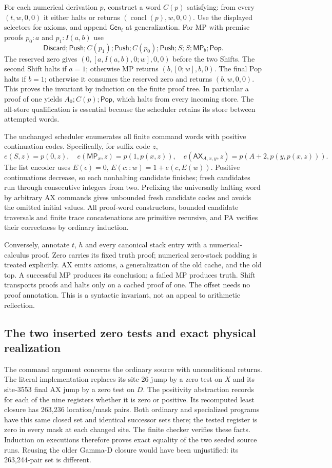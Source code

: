 For each numerical derivation $p$, construct a word $C(p)$ satisfying:
from every $(t,w,0,0)$ it either halts or returns
$(\operatorname{concl}(p),w,0,0)$. Use the displayed selectors for axioms,
and append $\mathsf{Gen}_i$ at generalization. For MP with premise
proofs $p_0:a$ and $p_1:I(a,b)$ use
\[
 \mathsf{Discard};\mathsf{Push};C(p_1);\mathsf{Push};C(p_0);
 \mathsf{Push};S;S;\mathsf{MP}_b;\mathsf{Pop}.
\]
The reserved zero gives $(0,[a,I(a,b),0;w],0,0)$ before the two Shifts.
The second Shift halts if $a=1$; otherwise MP returns
$(b,[0;w],b,0)$. The final Pop halts if $b=1$; otherwise it consumes the
reserved zero and returns $(b,w,0,0)$. This proves the invariant by
induction on the finite proof tree. In particular a proof of one yields
$A_0;C(p);\mathsf{Pop}$, which halts from every incoming store.
The all-store qualification is essential because the scheduler retains
its store between attempted words.

The unchanged scheduler enumerates all finite command words with positive
continuation codes. Specifically, for suffix code $z$,
\[
 e(S,z)=p(0,z),\quad e(\mathsf{MP}_x,z)=p(1,p(x,z)),\quad
 e(\mathsf{AX}_{A,x,y},z)=p(A+2,p(y,p(x,z))).
\]
The list encoder uses $E(\epsilon)=0$, $E(c::w)=1+e(c,E(w))$.
Positive continuations decrease, so each nonhalting candidate finishes;
fresh candidates run through consecutive integers from two. Prefixing
the universally halting word by arbitrary AX commands gives unbounded
fresh candidate codes and avoids the omitted initial values.
All proof-word constructors, bounded candidate traversals and finite
trace concatenations are primitive recursive, and PA verifies their
correctness by ordinary induction.

Conversely, annotate $t$, $h$ and every canonical stack entry with a
numerical-calculus proof. Zero carries its fixed truth proof; numerical
zero-stack padding is treated explicitly. AX emits axioms, a generalization
of the old cache, and the old top. A successful MP produces its conclusion;
a failed MP produces truth. Shift transports proofs and halts only on a
cached proof of one. The offset needs no proof annotation. This is a
syntactic invariant, not an appeal to arithmetic reflection.

\subsection{The two inserted zero tests and exact physical realization}

The command argument concerns the ordinary source with unconditional
returns. The literal implementation replaces its site-26 jump by a
zero test on $X$ and its site-3553 final AX jump by a zero test on $D$.
The positivity abstraction records for each of the nine registers whether
it is zero or positive. Its recomputed least closure has 263,236
location/mask pairs. Both ordinary and specialized programs have this
same closed set and identical successor sets there; the tested register
is zero in every mask at each changed site. The finite checker verifies
these facts. Induction on executions therefore proves exact equality
of the two seeded source runs. Reusing the older Gamma-D closure would
have been unjustified: its 263,244-pair set is different.

